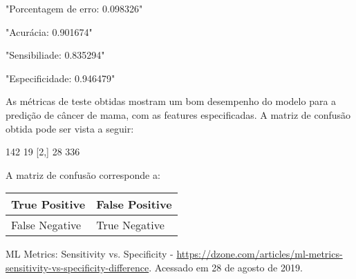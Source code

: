\documentclass{article}
\begin{document}
\begin{Schunk}
\begin{Soutput}
[1] "Porcentagem de erro: 0.098326"
\end{Soutput}
\begin{Soutput}
[1] "Acurácia: 0.901674"
\end{Soutput}
\begin{Soutput}
[1] "Sensibiliade: 0.835294"
\end{Soutput}
\begin{Soutput}
[1] "Especificidade: 0.946479"
\end{Soutput}
\end{Schunk}

As métricas de teste obtidas mostram um bom desempenho do modelo para a predição de câncer de mama, com as features especificadas. A matriz de confusão obtida pode ser vista a seguir:

\begin{Schunk}
\begin{Soutput}
     [,1] [,2]
[1,]  142   19
[2,]   28  336
\end{Soutput}
\end{Schunk}

A matriz de confusão corresponde a:

\begin{table}[H]
\begin{tabular}{|l|l|}
\hline
True Positive & False Positive \\ \hline
False Negative & True Negative \\ \hline
\end{tabular}
\end{table}







\begin{thebibliography}{1}

	ML Metrics: Sensitivity vs. Specificity -
	\url{https://dzone.com/articles/ml-metrics-sensitivity-vs-specificity-difference}.
	Acessado em 28 de agosto de 2019.


\end{thebibliography}
\end{document}
